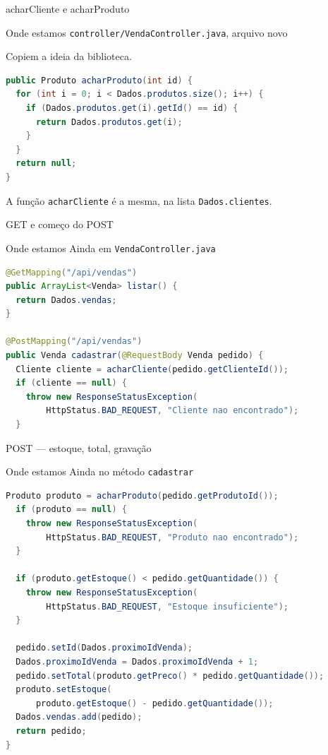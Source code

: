 \documentclass[aspectratio=169,11pt]{beamer}
\newcommand{\onde}[1]{%
  \begin{block}{Onde estamos}
    #1
  \end{block}
}
\begin{document}
\begin{frame}[fragile]{acharCliente e acharProduto}
  \onde{\texttt{controller/VendaController.java}, arquivo novo}

  Copiem a ideia da biblioteca.

\begin{lstlisting}[language=Java,basicstyle=\ttfamily\scriptsize]
public Produto acharProduto(int id) {
  for (int i = 0; i < Dados.produtos.size(); i++) {
    if (Dados.produtos.get(i).getId() == id) {
      return Dados.produtos.get(i);
    }
  }
  return null;
}
\end{lstlisting}

  A função \texttt{acharCliente} é a mesma, na lista
  \texttt{Dados.clientes}.
\end{frame}

\begin{frame}[fragile]{GET e começo do POST}
  \onde{Ainda em \texttt{VendaController.java}}

\begin{lstlisting}[language=Java,basicstyle=\ttfamily\scriptsize]
@GetMapping("/api/vendas")
public ArrayList<Venda> listar() {
  return Dados.vendas;
}

@PostMapping("/api/vendas")
public Venda cadastrar(@RequestBody Venda pedido) {
  Cliente cliente = acharCliente(pedido.getClienteId());
  if (cliente == null) {
    throw new ResponseStatusException(
        HttpStatus.BAD_REQUEST, "Cliente nao encontrado");
  }
\end{lstlisting}
\end{frame}

\begin{frame}[fragile,shrink=5]{POST --- estoque, total, gravação}
  \onde{Ainda no método \texttt{cadastrar}}

\begin{lstlisting}[language=Java,basicstyle=\ttfamily\scriptsize]
  Produto produto = acharProduto(pedido.getProdutoId());
  if (produto == null) {
    throw new ResponseStatusException(
        HttpStatus.BAD_REQUEST, "Produto nao encontrado");
  }

  if (produto.getEstoque() < pedido.getQuantidade()) {
    throw new ResponseStatusException(
        HttpStatus.BAD_REQUEST, "Estoque insuficiente");
  }

  pedido.setId(Dados.proximoIdVenda);
  Dados.proximoIdVenda = Dados.proximoIdVenda + 1;
  pedido.setTotal(produto.getPreco() * pedido.getQuantidade());
  produto.setEstoque(
      produto.getEstoque() - pedido.getQuantidade());
  Dados.vendas.add(pedido);
  return pedido;
}
\end{lstlisting}
\end{frame}
\end{document}
